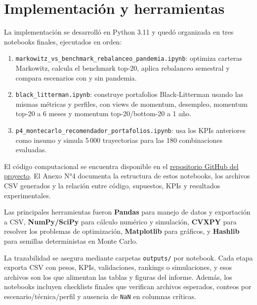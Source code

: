 \section{Implementaci\'on y herramientas}

La implementaci\'on se desarroll\'o en Python 3.11 y qued\'o organizada en tres
notebooks finales, ejecutados en orden:

\begin{enumerate}
    \item \texttt{markowitz\_vs\_benchmark\_rebalanceo\_pandemia.ipynb}:
    optimiza carteras Markowitz, calcula el benchmark top-20, aplica rebalanceo
    semestral y compara escenarios con y sin pandemia.

    \item \texttt{black\_litterman.ipynb}: construye portafolios
    Black-Litterman usando las mismas m\'etricas y perfiles, con views de
    momentum, desempleo, momentum top-20 a 6 meses y momentum top-20/bottom-20
    a 1 a\~no.

    \item \texttt{p4\_montecarlo\_recomendador\_portafolios.ipynb}: usa los
    KPIs anteriores como insumo y simula 5\,000 trayectorias para las 180
    combinaciones evaluadas.
\end{enumerate}

El c\'odigo computacional se encuentra disponible en el
\href{https://github.com/Psacevedo/Capstone.git}{repositorio GitHub del proyecto}.
El Anexo N°4 documenta la estructura de estos notebooks, los archivos CSV
generados y la relaci\'on entre c\'odigo, supuestos, KPIs y resultados
experimentales.

Las principales herramientas fueron \textbf{Pandas} para manejo de datos y
exportaci\'on a CSV, \textbf{NumPy/SciPy} para c\'alculo num\'erico y
simulaci\'on, \textbf{CVXPY} para resolver los problemas de optimizaci\'on,
\textbf{Matplotlib} para gr\'aficos, y \textbf{Hashlib} para semillas
deterministas en Monte Carlo.

La trazabilidad se asegura mediante carpetas \texttt{outputs/} por notebook.
Cada etapa exporta CSV con pesos, KPIs, validaciones, rankings o simulaciones,
y esos archivos son los que alimentan las tablas y figuras del informe. Adem\'as,
los notebooks incluyen checklists finales que verifican archivos esperados,
conteos por escenario/t\'ecnica/perfil y ausencia de \texttt{NaN} en columnas
cr\'iticas. 
